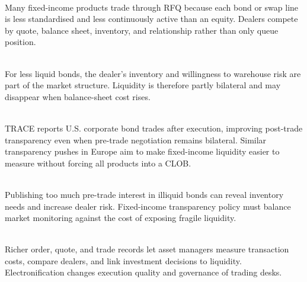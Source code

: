 \documentclass[a4paper,oneside,openany]{book}
\begin{document}
\begin{principle} \\
Many fixed-income products trade through RFQ because each bond or swap line is less standardised and less continuously active than an equity. Dealers compete by quote, balance sheet, inventory, and relationship rather than only queue position.
\end{principle}

\begin{mechanism} \\
For less liquid bonds, the dealer's inventory and willingness to warehouse risk are part of the market structure. Liquidity is therefore partly bilateral and may disappear when balance-sheet cost rises.
\end{mechanism}

\begin{marketrule} \\
TRACE reports U.S. corporate bond trades after execution, improving post-trade transparency even when pre-trade negotiation remains bilateral. Similar transparency pushes in Europe aim to make fixed-income liquidity easier to measure without forcing all products into a CLOB.
\end{marketrule}

\begin{caveat} \\
Publishing too much pre-trade interest in illiquid bonds can reveal inventory needs and increase dealer risk. Fixed-income transparency policy must balance market monitoring against the cost of exposing fragile liquidity.
\end{caveat}

\begin{practitionernote} \\
Richer order, quote, and trade records let asset managers measure transaction costs, compare dealers, and link investment decisions to liquidity. Electronification changes execution quality and governance of trading desks.
\end{practitionernote}
\end{document}
